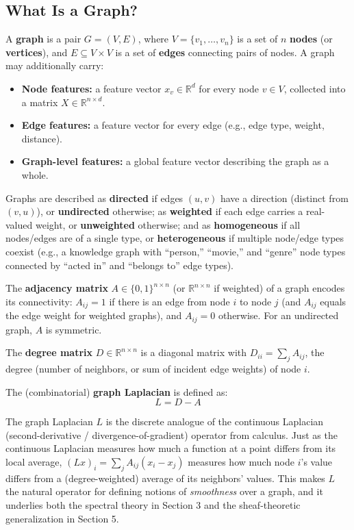 \documentclass[12pt,a4paper]{article}
\begin{document}
\subsection{What Is a Graph?}

\begin{defbox}
A \textbf{graph} is a pair $G = (V, E)$, where $V = \{v_1, \ldots, v_n\}$ is a set of $n$ \textbf{nodes} (or \textbf{vertices}), and $E \subseteq V \times V$ is a set of \textbf{edges} connecting pairs of nodes. A graph may additionally carry:
\begin{itemize}[leftmargin=1.5em]
    \item \textbf{Node features:} a feature vector $x_v \in \mathbb{R}^d$ for every node $v \in V$, collected into a matrix $X \in \mathbb{R}^{n \times d}$.
    \item \textbf{Edge features:} a feature vector for every edge (e.g., edge type, weight, distance).
    \item \textbf{Graph-level features:} a global feature vector describing the graph as a whole.
\end{itemize}
\end{defbox}

Graphs are described as \textbf{directed} if edges $(u,v)$ have a direction (distinct from $(v,u)$), or \textbf{undirected} otherwise; as \textbf{weighted} if each edge carries a real-valued weight, or \textbf{unweighted} otherwise; and as \textbf{homogeneous} if all nodes/edges are of a single type, or \textbf{heterogeneous} if multiple node/edge types coexist (e.g., a knowledge graph with ``person,'' ``movie,'' and ``genre'' node types connected by ``acted in'' and ``belongs to'' edge types).

\begin{defbox}
The \textbf{adjacency matrix} $A \in \{0,1\}^{n\times n}$ (or $\mathbb{R}^{n\times n}$ if weighted) of a graph encodes its connectivity: $A_{ij} = 1$ if there is an edge from node $i$ to node $j$ (and $A_{ij}$ equals the edge weight for weighted graphs), and $A_{ij}=0$ otherwise. For an undirected graph, $A$ is symmetric.

The \textbf{degree matrix} $D \in \mathbb{R}^{n\times n}$ is a diagonal matrix with $D_{ii} = \sum_j A_{ij}$, the degree (number of neighbors, or sum of incident edge weights) of node $i$.

The (combinatorial) \textbf{graph Laplacian} is defined as:
\[
L = D - A
\]
\end{defbox}

\begin{keyidea}
The graph Laplacian $L$ is the discrete analogue of the continuous Laplacian (second-derivative / divergence-of-gradient) operator from calculus. Just as the continuous Laplacian measures how much a function at a point differs from its local average, $(Lx)_i = \sum_j A_{ij}(x_i - x_j)$ measures how much node $i$'s value differs from a (degree-weighted) average of its neighbors' values. This makes $L$ the natural operator for defining notions of \emph{smoothness} over a graph, and it underlies both the spectral theory in Section 3 and the sheaf-theoretic generalization in Section 5.
\end{keyidea}
\end{document}
